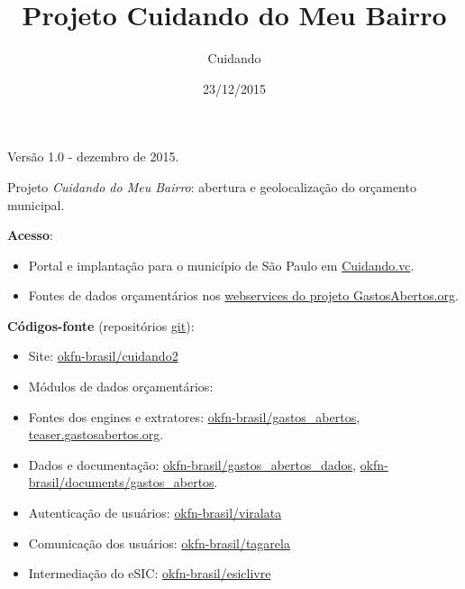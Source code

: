 \documentclass[letterpaper,10pt,brazil]{sphinxmanual}
\title{Projeto Cuidando do Meu Bairro}
\date{23/12/2015}
\author{Cuidando}
\begin{document}
\maketitle
\tableofcontents
{}\label{index::doc}


Versão 1.0 - dezembro de 2015.

Projeto \emph{Cuidando do Meu Bairro}: abertura e geolocalização do orçamento municipal.

\textbf{Acesso}:
\begin{itemize}
\item {} 
Portal e implantação para o município de São Paulo em  \href{http://cuidando.vc}{Cuidando.vc}.

\item {} 
Fontes de dados orçamentários nos \href{http://demo.gastosabertos.org}{webservices do projeto GastosAbertos.org}.

\end{itemize}

\textbf{Códigos-fonte} (repositórios \href{https://pt.wikipedia.org/wiki/Git}{git}):
\begin{itemize}
\item {} 
Site:
\href{https://github.com/okfn-brasil/cuidando2}{okfn-brasil/cuidando2}

\item {} 
Módulos de dados orçamentários:

\item {} 
Fontes dos engines e extratores:
\href{https://github.com/okfn-brasil/gastos\_abertos}{okfn-brasil/gastos\_abertos},
\href{https://github.com/okfn-brasil/teaser.gastosabertos.org}{teaser.gastosabertos.org}.

\item {} 
Dados e documentação:
\href{https://github.com/okfn-brasil/gastos\_abertos\_dados}{okfn-brasil/gastos\_abertos\_dados},
\href{https://github.com/okfn-brasil/documents/blob/master/gastos\_abertos}{okfn-brasil/documents/gastos\_abertos}.

\item {} 
Autenticação de usuários:
\href{https://github.com/okfn-brasil/viralata}{okfn-brasil/viralata}

\item {} 
Comunicação dos usuários:
\href{https://github.com/okfn-brasil/tagarela}{okfn-brasil/tagarela}

\item {} 
Intermediação do eSIC:
\href{https://github.com/okfn-brasil/esiclivre}{okfn-brasil/esiclivre}

\end{itemize}
\end{document}

